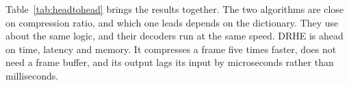 Table~\ref{tab:headtohead} brings the results together. The two algorithms are
close on compression ratio, and which one leads depends on the dictionary. They
use about the same logic, and their decoders run at the same speed. DRHE is
ahead on time, latency and memory. It compresses a frame five times faster,
does not need a frame buffer, and its output lags its input by microseconds
rather than milliseconds.
